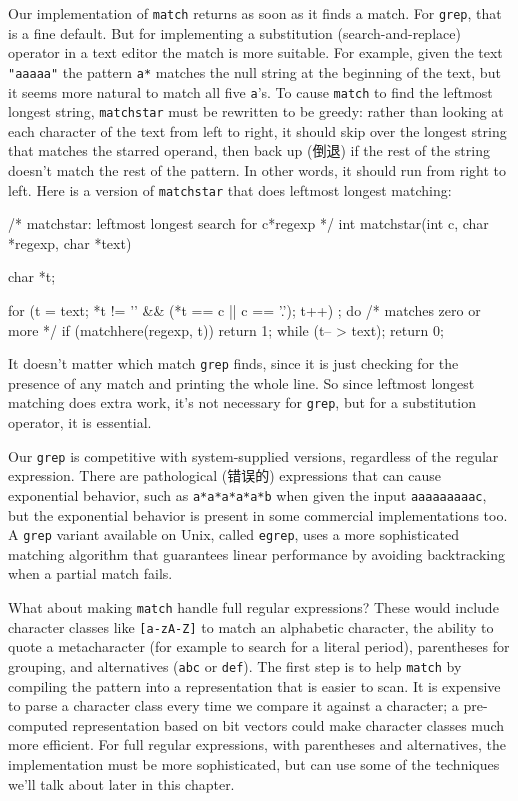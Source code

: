 Our implementation of \verb'match' returns as soon as it finds a match. For
\verb'grep', that is a fine default. But for implementing a substitution
(search-and-replace) operator in a text editor the 
match is more suitable. For example, given the text
\verb'"aaaaa"' the pattern \verb'a*' matches the null string at the
beginning of the text, but it seems more natural to match all five
\verb'a''s. To cause \verb'match' to find the leftmost longest string,
\verb'matchstar' must be rewritten to be greedy: rather than looking at
each character of the text from left to right, it should skip over the
longest string that matches the starred operand, then back up (倒退) if the
rest of the string doesn't match the rest of the pattern. In other words,
it should run from right to left. Here is a version of \verb'matchstar'
that does leftmost longest matching:
\begin{wellcode}
    /* matchstar: leftmost longest search for c*regexp */
    int matchstar(int c, char *regexp, char *text)
    {
        char    *t;

        for (t = text; *t != '\0' && (*t == c || c == '.');
                t++)
            ;
        do {    /* matches zero or more */
            if (matchhere(regexp, t))
                return 1;
        } while (t-- > text);
        return 0;
    }
\end{wellcode}
It doesn't matter which match \verb'grep' finds, since it is just checking
for the presence of any match and printing the whole line. So since
leftmost longest matching does extra work, it's not necessary for
\verb'grep', but for a substitution operator, it is essential.

Our \verb'grep' is competitive with system-supplied versions, regardless of
the regular expression. There are pathological (错误的) expressions that
can cause exponential behavior, such as \verb'a*a*a*a*a*b' when given the
input \verb'aaaaaaaaac', but the exponential behavior is present in some
commercial implementations too. A \verb'grep' variant available on Unix,
called \verb'egrep', uses a more sophisticated matching algorithm that
guarantees linear performance by avoiding backtracking when a partial match
fails.

What about making \verb'match' handle full regular expressions? These would
include character classes like \verb'[a-zA-Z]' to match an alphabetic
character, the ability to quote a metacharacter (for example to search for
a literal period), parentheses for grouping, and alternatives (\verb'abc'
or \verb'def'). The first step is to help \verb'match' by compiling the
pattern into a representation that is easier to scan. It is expensive to
parse a character class every time we compare it against a character; a
pre-computed representation based on bit vectors could make character
classes much more efficient. For full regular expressions, with parentheses
and alternatives, the implementation must be more sophisticated, but can
use some of the techniques we'll talk about later in this chapter.

